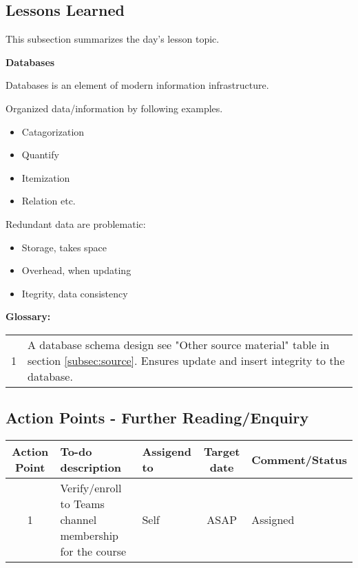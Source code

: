 \subsection{Lessons Learned}

This subsection summarizes the day's lesson topic.

{\bfseries{Databases}}


Databases is an element of modern information infrastructure.


Organized data/information by following examples.


\begin{itemize}
    \item Catagorization
    \item Quantify
    \item Itemization
    \item Relation etc.
\end{itemize}


Redundant data are problematic:
\begin{itemize}
    \item Storage, takes space
    \item Overhead, when updating
    \item Itegrity, data consistency
\end{itemize}


{\bfseries{Glossary:}}


\begin{tabular}{c | p{140mm}}
        1 & A database schema design see "Other source material" table in section \ref{subsec:source}. Ensures update and insert integrity to the database.\\
\end{tabular}



\subsection{Action Points - Further Reading/Enquiry}

\begin{adjustbox}{max width=\textwidth}
\begin{tabular}{c|l|l|c|l}
    Action Point & To-do description & Assigend to & Target date & Comment/Status \\
    \hline
    1 & Verify/enroll to Teams channel membership for the course & Self & ASAP & Assigned \\
\end{tabular}
\end{adjustbox}

